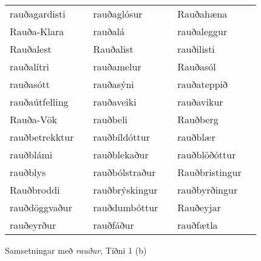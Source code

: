 \documentclass[../samsetningasafn.tex]{subfiles}
\begin{document}
\begin{wordlist}[H]
\begin{tcolorbox}
\begin{tabular}{BlBlBl}
		rauðagardisti		&		& 
		rauðaglósur		&		& 
		Rauðahæna		&		\\  %
		Rauða-Klara		&		& 
		rauðalá			&		& 
		rauðaleggur		&		\\  %
		Rauðalest		&		& 
		Rauðalist		&		& 	
		rauðilisti			&		\\  %
		rauðalítri			&		& 
		rauðamelur		&		& 
		Rauðasól		&		\\  %
		rauðasótt		&		& 
		rauðasýni		&		& 
		rauðateppið		&		\\  %
		rauðaútfelling	&		& 
		rauðaveiki		&		& 
		rauðavikur		&		\\  %
		Rauða-Vök		&		& 
		rauðbeli			&		& 
		Rauðberg		&		\\  %
		rauðbetrekktur	&		& 
		rauðbíldóttur		&		& 
		rauðblær		&		\\  %
		rauðblámi		&		& 
		rauðblekaður		&		& 
		rauðblöðóttur	&		\\  %
		rauðblys			&		& 
		rauðbólstraður	&		& 
		Rauðbristingur	&		\\  %
		Rauðbroddi		& 		& 
		rauðbrýskingur	&		& 
		rauðbyrðingur	&		\\  %
		rauðdöggvaður	&		& 
		rauðdumbóttur	&		& 
		Rauðeyjar		&		\\  %
		rauðeyrður		&		& 
		rauðfáður		&		& 
		rauðfætla		&		 
	\end{tabular}

\end{tcolorbox}
	\caption{Samsetningar með \textit{rauður}, Tíðni 1 (b)}
	\label{listi:rautt.1b}
\end{wordlist}		
		
\end{document}
